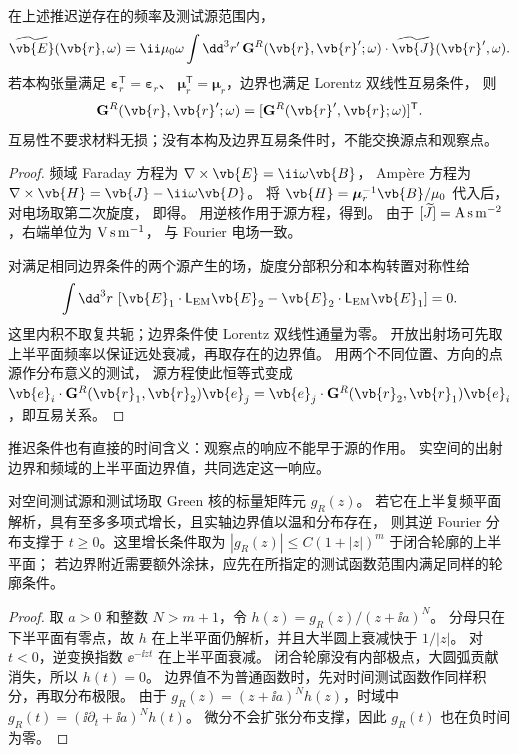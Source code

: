 \begin{proposition}[电流响应与互易性]
在上述推迟逆存在的频率及测试源范围内，
\begin{equation}
\widetilde{\vb{E}}(\vb{r},\omega)=\ii\mu_0\omega
\int\dd^3r'\,\mathbf G^R(\vb{r},\vb{r}';\omega)
\cdot\widetilde{\vb{J}}(\vb{r}',\omega).
\label{eq:feqo-primer-source-field}
\end{equation}
若本构张量满足 $\boldsymbol\varepsilon_r^{\mathsf T}=\boldsymbol\varepsilon_r$、
$\boldsymbol\mu_r^{\mathsf T}=\boldsymbol\mu_r$，边界也满足 Lorentz 双线性互易条件，
则
\begin{equation}
\mathbf G^R(\vb{r},\vb{r}';\omega)
=[\mathbf G^R(\vb{r}',\vb{r};\omega)]^{\mathsf T}.
\label{eq:feqo-primer-reciprocity}
\end{equation}
互易性不要求材料无损；没有本构及边界互易条件时，不能交换源点和观察点。
\end{proposition}
\begin{proof}
频域 Faraday 方程为 $\nabla\times\vb{E}=\ii\omega\vb{B}$，
Amp\`ere 方程为 $\nabla\times\vb{H}=\vb{J}-\ii\omega\vb{D}$。
将 $\vb{H}=\boldsymbol\mu_r^{-1}\vb{B}/\mu_0$ 代入后，对电场取第二次旋度，
即得。
用逆核作用于源方程，得到。
由于 $[\widetilde J]={\rm A\,s\,m^{-2}}$，右端单位为 ${\rm V\,s\,m^{-1}}$，
与 Fourier 电场一致。

对满足相同边界条件的两个源产生的场，旋度分部积分和本构转置对称性给
\[
\int\dd^3r\,\left[\vb{E}_1\cdot\mathsf L_{\rm EM}\vb{E}_2
-\vb{E}_2\cdot\mathsf L_{\rm EM}\vb{E}_1\right]=0.
\]
这里内积不取复共轭；边界条件使 Lorentz 双线性通量为零。
开放出射场可先取上半平面频率以保证远处衰减，再取存在的边界值。
用两个不同位置、方向的点源作分布意义的测试，
源方程使此恒等式变成 $\vb{e}_i\cdot\mathbf G^R(\vb{r}_1,\vb{r}_2)\vb{e}_j
=\vb{e}_j\cdot\mathbf G^R(\vb{r}_2,\vb{r}_1)\vb{e}_i$，即互易关系。
\end{proof}

推迟条件也有直接的时间含义：观察点的响应不能早于源的作用。
实空间的出射边界和频域的上半平面边界值，共同选定这一响应。
\begin{proposition}[推迟响应的时间支撑]
对空间测试源和测试场取 Green 核的标量矩阵元 $g_R(z)$。
若它在上半复频平面解析，具有至多多项式增长，且实轴边界值以温和分布存在，
则其逆 Fourier 分布支撑于 $t\ge0$。这里增长条件取为
$|g_R(z)|\le C(1+|z|)^m$ 于闭合轮廓的上半平面；
若边界附近需要额外涂抹，应先在所指定的测试函数范围内满足同样的轮廓条件。
\end{proposition}
\begin{proof}
取 $a>0$ 和整数 $N>m+1$，令 $h(z)=g_R(z)/(z+\ii a)^N$。
分母只在下半平面有零点，故 $h$ 在上半平面仍解析，并且大半圆上衰减快于 $1/|z|$。
对 $t<0$，逆变换指数 $\ee^{-\ii zt}$ 在上半平面衰减。
闭合轮廓没有内部极点，大圆弧贡献消失，所以 $h(t)=0$。
边界值不为普通函数时，先对时间测试函数作同样积分，再取分布极限。
由于 $g_R(z)=(z+\ii a)^Nh(z)$，时域中
$g_R(t)=(\ii\partial_t+\ii a)^Nh(t)$。
微分不会扩张分布支撑，因此 $g_R(t)$ 也在负时间为零。
\end{proof}

